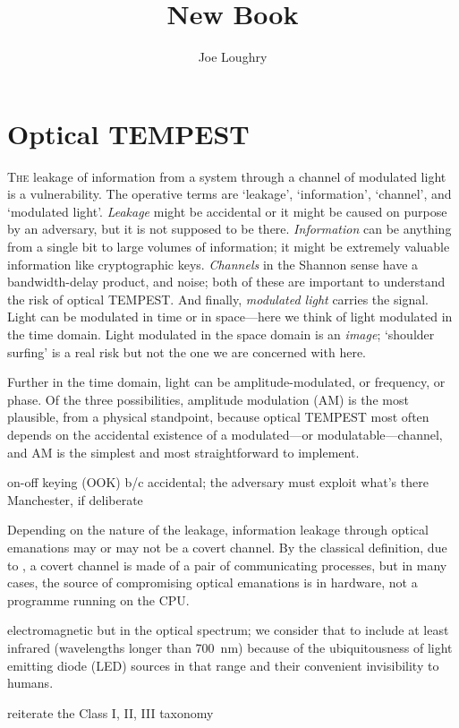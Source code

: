 \documentclass[a4paper,twoside]{book}
\begin{document}
\title{New Book}
\author{Joe Loughry}
\setcounter{chapter}{6} %
\setcounter{page}{99} %
\chapter{Optical TEMPEST}
\lettrine[lines=3]{T}{he} leakage of information from a system through a
channel of modulated light is a vulnerability. The operative terms are `leakage',
`information', `channel', and `modulated light'. \emph{Leakage} might be
accidental or it might be caused on purpose by an adversary, but it is not
supposed to be there. \emph{Information} can be anything from a single bit to
large volumes of information; it might be extremely valuable information like
cryptographic keys. \emph{Channels} in the Shannon sense\cite{Shannon1948}
have a bandwidth-delay product, and noise; both of these are important to
understand the risk of optical TEMPEST. And finally, \emph{modulated light}
carries the signal. Light can be modulated in time or in space---here we think of
light modulated in the time domain. Light modulated in the space domain is an
\emph{image}; `shoulder surfing' is a real risk but not the one we are
concerned with here.

Further in the time domain, light can be amplitude-modulated, or frequency, or
phase. Of the three possibilities, amplitude modulation (AM) is the most
plausible, from a physical standpoint, because optical TEMPEST most often
depends on the accidental existence of a modulated---or modulatable---channel,
and AM is the simplest and most straightforward to implement.

on-off keying (OOK) b/c accidental; the adversary must exploit what's there
Manchester, if deliberate

Depending on the nature of the leakage, information leakage through optical
emanations may or may not be a covert channel. By the classical definition,
due to \cite{Lampson1973}, a covert channel is made of a pair of communicating
processes, but in many cases, the source of compromising optical emanations
is in hardware, not a programme running on the CPU.

electromagnetic but in the optical spectrum; we consider that to include at
least infrared (wavelengths longer than \SI{700}{\nano\metre}) because of the
ubiquitousness of light emitting diode (LED) sources in that range and their
convenient invisibility to humans.

reiterate the Class I, II, III taxonomy
\end{document}
